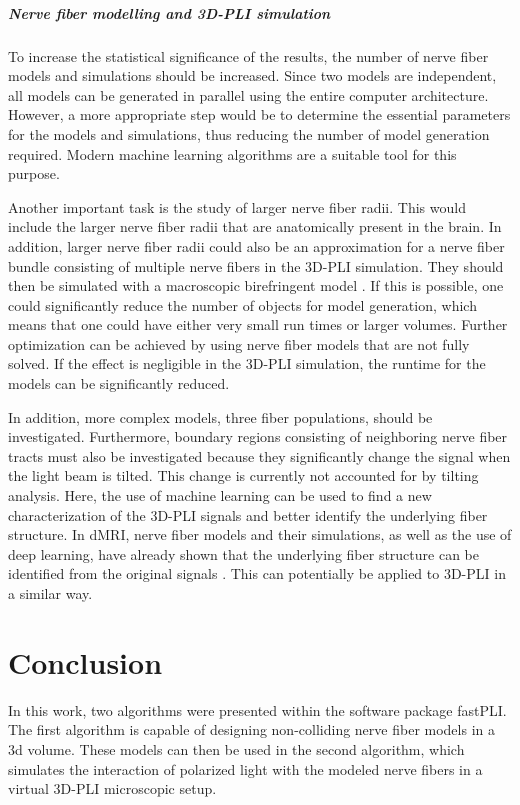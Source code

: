 \paragraph{Nerve fiber modelling and \ac{3D-PLI} simulation}
% 
To increase the statistical significance of the results, the number of nerve fiber models and simulations should be increased.
Since two models are independent, all models can be generated in parallel using the entire computer architecture.
However, a more appropriate step would be to determine the essential parameters for the models and simulations, thus reducing the number of model generation required.
Modern machine learning algorithms are a suitable tool for this purpose.
\par
% 
Another important task is the study of larger nerve fiber radii.
This would include the larger nerve fiber radii that are anatomically present in the brain.
In addition, larger nerve fiber radii could also be an approximation for a nerve fiber bundle consisting of multiple nerve fibers in the \ac{3D-PLI} simulation.
They should then be simulated with a macroscopic birefringent model \cite{Menzel2015}.
If this is possible, one could significantly reduce the number of objects for model generation, which means that one could have either very small run times or larger volumes.
Further optimization can be achieved by using nerve fiber models that are not fully solved.
If the effect is negligible in the \ac{3D-PLI} simulation, the runtime for the models can be significantly reduced.
\par
% 
In addition, more complex models, \eg{} three fiber populations, should be investigated.
Furthermore, boundary regions consisting of neighboring nerve fiber tracts must also be investigated because they significantly change the signal when the light beam is tilted.
This change is currently not accounted for by tilting analysis.
Here, the use of machine learning can be used to find a new characterization of the \ac{3D-PLI} signals and better identify the underlying fiber structure.
In \ac{dMRI}, nerve fiber models and their simulations, as well as the use of deep learning, have already shown that the underlying fiber structure can be identified from the original signals \cite{ginsburgerDis2019}.
This can potentially be applied to \ac{3D-PLI} in a similar way.
% 
% 
% 
% 
% 
\chapter{Conclusion}
\label{sec:conclusion}
% 
In this work, two algorithms were presented within the software package \ac{fastPLI}.
The first algorithm is capable of designing non-colliding nerve fiber models in a 3d volume.
These models can then be used in the second algorithm, which simulates the interaction of polarized light with the modeled nerve fibers in a virtual \ac{3D-PLI} microscopic setup.
% 
% 
% 
